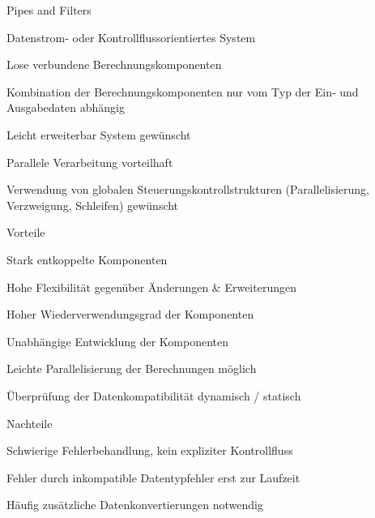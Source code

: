 \documentclass[a4paper]{article}
\begin{document}
\begin{multicols}{3}
  Pipes and Filters
  \begin{itemize*}
    \item Datenstrom- oder Kontrollflussorientiertes System
    \item Lose verbundene Berechnungskomponenten
    \item Kombination der Berechnungskomponenten nur vom Typ der Ein- und Ausgabedaten abhängig
    \item Leicht erweiterbar System gewünscht
    \item Parallele Verarbeitung vorteilhaft
    \item Verwendung von globalen Steuerungskontrollstrukturen (Parallelisierung, Verzweigung, Schleifen) gewünscht
    \item Vorteile
          \begin{itemize*}
            \item Stark entkoppelte Komponenten
            \item Hohe Flexibilität gegenüber Änderungen \& Erweiterungen
            \item Hoher Wiederverwendungsgrad der Komponenten
            \item Unabhängige Entwicklung der Komponenten
            \item Leichte Parallelisierung der Berechnungen möglich
            \item Überprüfung der Datenkompatibilität dynamisch / statisch
          \end{itemize*}
    \item Nachteile
          \begin{itemize*}
            \item Schwierige Fehlerbehandlung, kein expliziter Kontrollfluss
            \item Fehler durch inkompatible Datentypfehler erst zur Laufzeit
            \item Häufig zusätzliche Datenkonvertierungen notwendig
          \end{itemize*}
  \end{itemize*}



\end{multicols}
\end{document}
